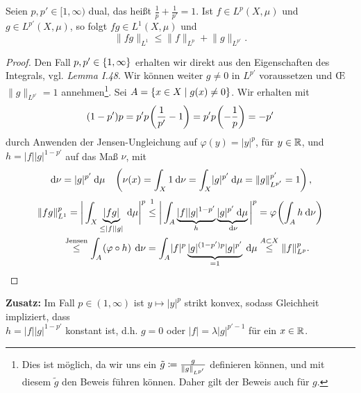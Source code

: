 \documentclass[skript.tex]{subfiles}
\begin{document}
	
\setcounter{cntr}{5}

\begin{theorem}[Hölder]
	Seien $p, p' \in [1, \infty)$ \textup{dual}, das heißt $\frac{1}{p} + \frac{1}{p'} = 1$. Ist $f \in L^p (X, \mu)$ und $g \in L^{p'} (X,\mu)$, so folgt $fg \in L^1(X,\mu)$ und 
	\[
		\lVert fg \rVert_{L^1} \leq \lVert f \rVert_{L^p} + \lVert g \rVert_{L^{p'}}.
	\]
\end{theorem}

\begin{proof}
	Den Fall $p,p' \in \left\{1,\infty\right\}$ erhalten wir direkt aus den Eigenschaften des Integrals, vgl. \textit{Lemma I.48}. Wir können weiter $g\neq 0$ in $L^{p'}$ voraussetzen und \OE\ $\lVert g \rVert_{L^{p'}} = 1$ annehmen\footnote{Dies ist möglich, da wir uns ein $\tilde{g} \coloneqq \frac{g}{\lVert g \rVert_{L^{p'} } }$ definieren können, und mit diesem $\tilde{g}$ den Beweis führen können. Daher gilt der Beweis auch für $g$.}. Sei $A = \left\{x\in X \mid g(x) \neq 0\right\}$. Wir erhalten mit 
	\[
		(1-p')p = p'p\pr{\frac{1}{p'} -1} = p'p\pr{-\frac{1}{p}} = -p'
	\]
	durch Anwenden der Jensen-Ungleichung auf $\varphi(y) = \lvert y \rvert^p$, für $y \in \mathbb{R}$, und $h=\lvert f \rvert \lvert g \rvert^{1-p'}$ auf das Maß $\nu$, mit 
	\[
		\md \nu = \lvert g \rvert^{p'} \md \mu \quad \pr{\nu(x) = \int_X 1 \md \nu = \int_X \lvert g \rvert^{p'} \md \mu = \lVert g \rVert_{L^{p'}}^{p'} = 1},
	\]
	\begin{align*}
		\lVert fg \rVert_{L^1}^{p} &= \bigg\lvert \int_X \underbrace{\lvert fg \rvert }_{\leq \lvert f \rvert \lvert g \rvert} \md \mu \bigg\rvert^p \stackrel{\footnotemark}{\leq} \bigg\lvert \int_A \underbrace{\lvert f \rvert \lvert g \rvert^{1-p'}}_{h} \underbrace{\lvert g \rvert^{p'} \md \mu}_{\md \nu} \bigg\rvert^p = \varphi \pr{\int_A h \md \nu}\\
		&\kern -0.5em \stackrel{\text{\scriptsize Jensen}}{\leq} \int_A \pr{\varphi \circ h} \md \nu = \int_A \lvert f \rvert^p \underbrace{\lvert g \rvert^{(1-p')p} \lvert g \rvert^{p'}}_{=1} \md \mu \stackrel{A\sbs X}{\leq} \lVert f \rVert_{L^p}^p.
	\end{align*}
\end{proof}

\textbf{Zusatz:} Im Fall $p \in (1, \infty)$ ist $y \mapsto \lvert y \rvert^p$ strikt konvex, sodass Gleichheit impliziert, dass \\$h = \lvert f \rvert \lvert g \rvert^{1-p'}$ konstant ist, d.h. $g=0$ oder $\lvert f \rvert = \lambda \lvert g \rvert^{p'-1}$ für ein $x \in \mathbb{R}$. %
\end{document}
